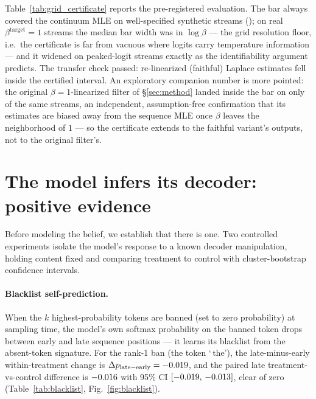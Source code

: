 \documentclass[11pt]{article}
\begin{document}
Table~\ref{tab:grid_certificate} reports the pre-registered evaluation. The
bar always covered the continuum MLE on well-specified synthetic streams
(\gridCertCoverage); on real $\beta^{\mathrm{target}}{=}1$ streams the
median bar width was \gridCertMedianWidthBtOne{} in $\log\beta$ --- the grid
resolution floor, i.e.\ the certificate is far from vacuous where logits
carry temperature information --- and it widened on peaked-logit streams
exactly as the identifiability argument predicts. The transfer check passed:
\gridCertFaithfulAgree{} re-linearized (faithful) Laplace estimates fell
inside the certified interval. An exploratory companion number is more
pointed: the original $\beta{=}1$-linearized filter of \S\ref{sec:method}
landed inside the bar on only \gridCertOriginalAgree{} of the same streams,
an independent, assumption-free confirmation that its estimates are biased
away from the sequence MLE once $\beta$ leaves the neighborhood of $1$ ---
so the certificate extends to the faithful variant's outputs, not to the
original filter's.

\section{The model infers its decoder: positive evidence}\label{sec:positive}
Before modeling the belief, we establish that there is one. Two controlled
experiments isolate the model's response to a known decoder manipulation,
holding content fixed and comparing treatment to control with cluster-bootstrap
confidence intervals.

\paragraph{Blacklist self-prediction.}
When the $k$ highest-probability tokens are banned (set to zero probability) at
sampling time, the model's own softmax probability on the banned token drops
between early and late sequence positions --- it learns its blacklist from the
absent-token signature. For the rank-1 ban (the token `\,the'), the late-minus-early
within-treatment change is $\Delta p_{\mathrm{late-early}} = -0.019$,
and the paired late treatment-vs-control difference is $-0.016$ with 95\%
CI $[-0.019,\,-0.013]$, clear of zero
(Table~\ref{tab:blacklist}, Fig.~\ref{fig:blacklist}).
\end{document}
